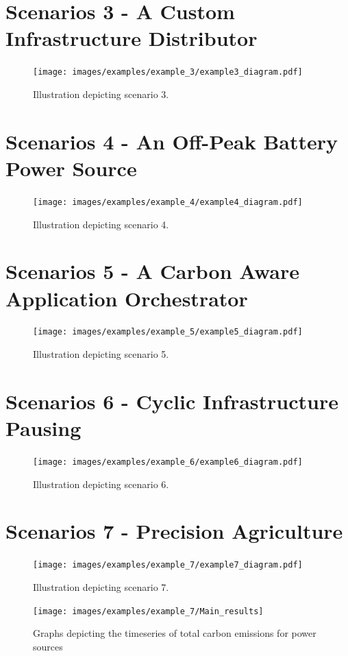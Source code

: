 \documentclass{l4proj}
\begin{document}
\section{Scenarios 3 - A Custom Infrastructure Distributor}\label{eval:subsec:scenario3}
\begin{figure}[h]
    \centering
    \texttt{[image: images/examples/example\_3/example3\_diagram.pdf]}
    ~
    \caption{Illustration depicting scenario 3.}
    \label{fig:example3_diagram}
\end{figure}

\section{Scenarios 4 - An Off-Peak Battery Power Source}\label{eval:subsec:scenario4}
\begin{figure}[h]
    \centering
    \texttt{[image: images/examples/example\_4/example4\_diagram.pdf]}
    ~
    \caption{Illustration depicting scenario 4.}
    \label{fig:example4_diagram}
\end{figure}

\section{Scenarios 5 - A Carbon Aware Application Orchestrator}\label{eval:subsec:scenario 5}
\begin{figure}[h]
    \centering
    \texttt{[image: images/examples/example\_5/example5\_diagram.pdf]}
    ~
    \caption{Illustration depicting scenario 5.}
    \label{fig:example5_diagram}
\end{figure}

\section{Scenarios 6 - Cyclic Infrastructure Pausing}\label{eval:subsec:scenario 6}
\begin{figure}[h]
    \centering
    \texttt{[image: images/examples/example\_6/example6\_diagram.pdf]}
    ~
    \caption{Illustration depicting scenario 6.}
    \label{fig:example6_diagram}
\end{figure}

\section{Scenarios 7 - Precision Agriculture}\label{eval:subsec:scenario 7}
\begin{figure}[h]
    \centering
    \texttt{[image: images/examples/example\_7/example7\_diagram.pdf]}
    ~
    \caption{Illustration depicting scenario 7.}
    \label{fig:example7_diagram}
\end{figure}
\begin{figure}[h]
    \centering
    \texttt{[image: images/examples/example\_7/Main\_results]}
    ~
    \caption{Graphs depicting the timeseries of total carbon emissions for power sources}
    \label{fig:example7_final_results}
\end{figure}
\end{document}
